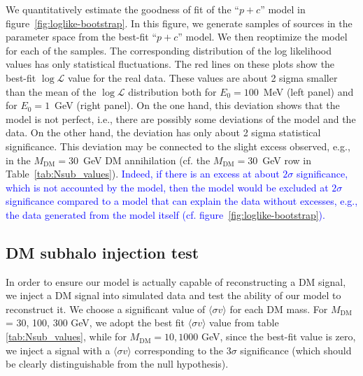 \documentclass[12pt, a4paper]{article}
\newcommand{\new}[1]{\textcolor{blue}{#1}}
\newcommand{\sigmav}{\langle \sigma v \rangle}
\newcommand{\mdm}{{M_\textrm{DM}}}
\begin{document}
We quantitatively estimate the goodness of fit of the ``$p + c$'' model in figure~\ref{fig:loglike-bootstrap}.
In this figure, we generate samples of sources in the parameter space from the best-fit ``$p + c$'' model. We then reoptimize the model for each of the samples.
The corresponding distribution of the log likelihood values has only statistical fluctuations.
The red lines on these plots show the best-fit $\log \mathcal{L}$ value for the real data.
These values are about 2 sigma smaller than the mean of the $\log \mathcal{L}$ distribution both for $E_0 = 100$~MeV (left panel) and for $E_0 = 1$~GeV (right panel).
On the one hand, this deviation shows that the model is not perfect, i.e., there are possibly some deviations of the model and the data.
On the other hand, the deviation has only about 2 sigma statistical significance.
This deviation may be connected to the slight excess observed, e.g., in the $\mdm = 30$~GeV DM annihilation (cf. the $\mdm = 30$~GeV row in Table~\ref{tab:Nsub_values}).
\new{Indeed, if there is an excess at about $2\sigma$ significance, which is not accounted by the model, then the model would be excluded at $2 \sigma$ significance compared to a model that can explain the data without excesses, e.g., the data generated from the model itself (cf. figure~\ref{fig:loglike-bootstrap}).}


\subsection{DM subhalo injection test}
\label{app:DM_injection}

In order to ensure our model is actually capable of reconstructing a DM signal, we inject a DM signal into simulated data and test the ability of our model to reconstruct it.
We choose a significant value of $\sigmav$ for each DM mass. For $\mdm$ = 30, 100, 300 GeV, we adopt the best fit $\sigmav$ value from table \ref{tab:Nsub_values}, while for $\mdm = 10, 1000$ GeV, since the best-fit value is zero, we inject a signal with a $\sigmav$ corresponding to the 3$\sigma$ significance (which should be clearly distinguishable from the null hypothesis). 
\end{document}
